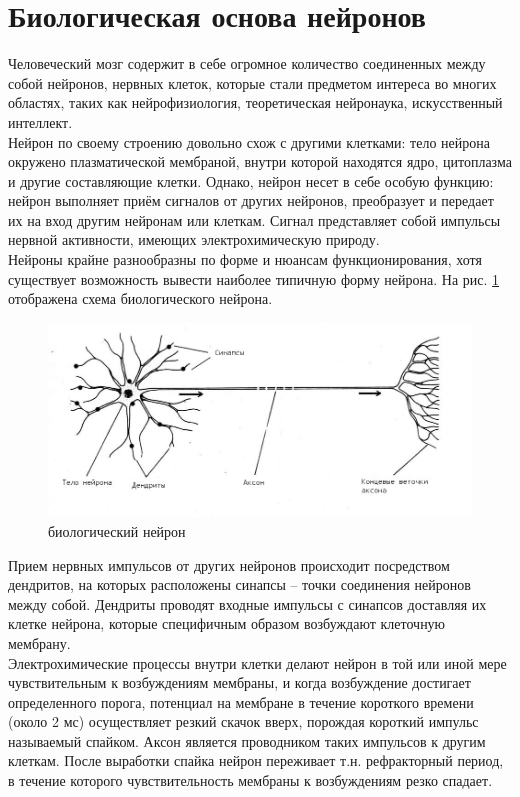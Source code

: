 \documentclass[a4paper,10pt]{article}
\begin{document}
\section{Биологическая основа нейронов}
\indent Человеческий мозг содержит в себе огромное количество соединенных между собой нейронов, нервных клеток, которые стали предметом интереса во многих областях, таких как нейрофизиология, теоретическая нейронаука, искусственный интеллект.\\
\indent Нейрон по своему строению довольно схож с другими клетками: тело нейрона окружено плазматической мембраной, внутри которой находятся ядро, цитоплазма и другие составляющие клетки. Однако, нейрон несет в себе особую функцию: нейрон выполняет приём сигналов от других нейронов, преобразует и передает их на вход другим нейронам или клеткам. Сигнал представляет собой импульсы нервной активности, имеющих электрохимическую природу.\\
\indent Нейроны крайне разнообразны по форме и нюансам функционирования, хотя существует возможность вывести наиболее типичную форму нейрона. На рис. \ref{bio_pic} отображена схема биологического нейрона. \\
\begin{figure}[ht]
\centering
\includegraphics[width=1\linewidth]{bio_neuron.jpg}
\caption{биологический нейрон}
\label{bio_pic}
\end{figure}
\indent Прием нервных импульсов от других нейронов происходит посредством дендритов, на которых расположены синапсы -- точки соединения нейронов между собой. Дендриты проводят входные импульсы с синапсов доставляя их клетке нейрона, которые специфичным образом возбуждают клеточную мембрану.\\
\indent Электрохимические процессы внутри клетки делают нейрон в той или иной мере чувствительным к возбуждениям мембраны, и когда возбуждение достигает определенного порога, потенциал на мембране в течение короткого времени (около 2 мс) осуществляет резкий скачок вверх, порождая короткий импульс называемый спайком. Аксон является проводником таких импульсов к другим клеткам. После выработки спайка нейрон переживает т.н. рефракторный период, в течение которого чувствительность мембраны к возбуждениям резко спадает.\\
\end{document}

